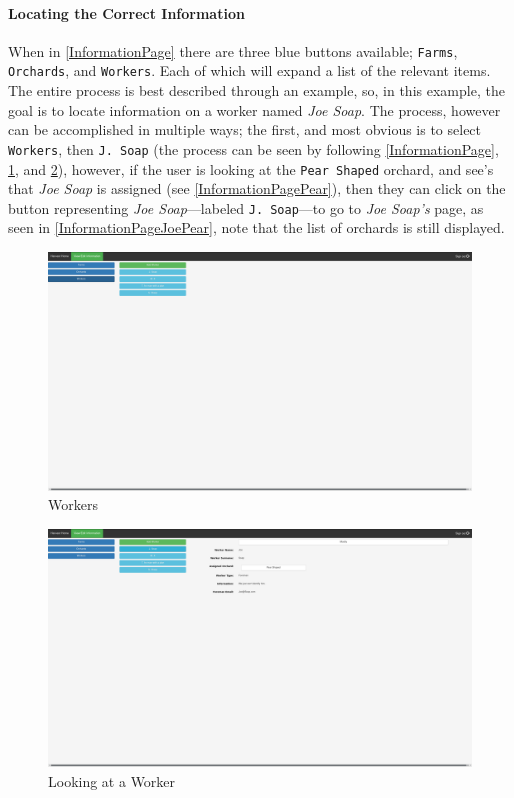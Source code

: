 \documentclass[11pt]{article}
\begin{document}
\paragraph{Locating the Correct Information}When in \ref{InformationPage} there are three blue buttons available; \texttt{Farms}, \texttt{Orchards}, and \texttt{Workers}. Each of which will expand a list of the relevant items. The entire process is best described through an example, so, in this example, the goal is to locate information on a worker named \textit{Joe Soap}. The process, however can be accomplished in multiple ways; the first, and most obvious is to select \texttt{Workers}, then \texttt{J. Soap} (the process can be seen by following \ref{InformationPage}, \ref{InformationPageWorkers}, and \ref{InformationPageJoe}), however, if the user is looking at the \texttt{Pear Shaped} orchard, and see's that \textit{Joe Soap} is assigned (see \ref{InformationPagePear}), then they can click on the button representing \textit{Joe Soap}---labeled \texttt{J. Soap}---to go to \textit{Joe Soap's} page, as seen in \ref{InformationPageJoePear}, note that the list of orchards is still displayed.

\begin{figure}
 \centering
 \includegraphics[width=12cm, keepaspectratio]{Images/webInformation-Workers.png}
 \caption{Workers}
 \label{InformationPageWorkers}
\end{figure}

\begin{figure}
 \centering
 \includegraphics[width=12cm, keepaspectratio]{Images/webInformation-LookWorker.png}
 \caption{Looking at a Worker}
 \label{InformationPageJoe}
\end{figure}
\end{document}
